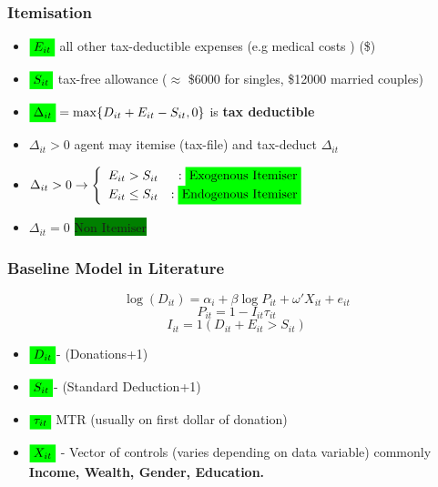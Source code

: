 \documentclass[options]{beamer}
\newcommand{\highlight}[1]{\colorbox{green}{\ensuremath{#1}}}
\begin{document}
		
		\begin{frame}
			\frametitle{Itemisation}
			\begin{itemize}
			\item $\highlight{E_{it}}$ all other tax-deductible expenses (e.g medical costs ) (\$)
				\vspace{15pt}
				\item  $\highlight{S_{it}}$	tax-free allowance ($\approx$ \$6000 for singles, \$12000  married couples)
				\vspace{15pt}
				\item  $\highlight{\Delta_{it}}=\max\{D_{it}+E_{it}-S_{it},0\}$ is \textbf{tax deductible }
				\vspace{15pt}
				\item  $\Delta_{it}>0$ agent may itemise (tax-file) and tax-deduct $\Delta_{it}$
				\vspace{15pt}
				\item[]	
				$\Delta_{it}>0 \rightarrow  \left\{
				\begin{array}{lr}
				E_{it} > S_{it}& : \highlight{\textrm{Exogenous Itemiser}}\\
				E_{it}\leq S_{it}& : \highlight{ \textrm{Endogenous Itemiser}}
				\end{array}
				\right.$
				\item[] $\Delta_{it}=0 $ \highlight{ \textrm{Non Itemiser}}
			\end{itemize}\end{frame}
	\begin{frame}
		\frametitle{Baseline Model in Literature}
	
	\begin{equation*}
\log(D_{it})= \alpha_i +\beta\log P_{it}+\omega 'X_{it}+ e_{it} 
	\end{equation*}		
	\begin{equation*} P_{it}=1-I_{it}\tau _{it} \end{equation*}
	\begin{equation*} I_{it}=1( D_{it}+E_{it}>S_{it}) \end{equation*}
					\begin{itemize}
	\item[] $\highlight{D_{it}}$- (Donations+1)

\vspace{5pt}
\item[] $\highlight{S_{it}}$- (Standard Deduction+1)

\vspace{5pt}
\item[] $\highlight{\tau_{it} }$ MTR (usually on first dollar of donation)

\vspace{5pt}
\item[] 	$\highlight{X_{it}}$ - Vector of controls (varies depending on data variable) commonly \textbf{Income, Wealth, Gender, Education.}
	
	
		\end{itemize}\end{frame}
			
\end{document}
